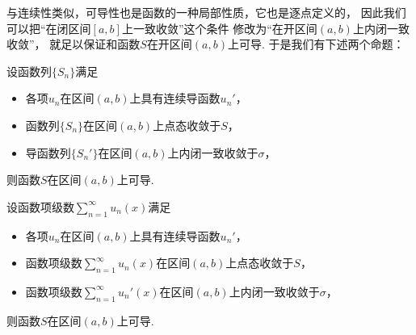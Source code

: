 与连续性类似，可导性也是函数的一种局部性质，它也是逐点定义的，
因此我们可以把“在闭区间\([a,b]\)上一致收敛”这个条件
修改为“在开区间\((a,b)\)上内闭一致收敛”，
就足以保证和函数\(S\)在开区间\((a,b)\)上可导.
于是我们有下述两个命题：
\begin{proposition}
设函数列\(\{S_n\}\)满足\begin{itemize}
	\item 各项\(u_n\)在区间\((a,b)\)上具有连续导函数\(u_n'\)，
	\item 函数列\(\{S_n\}\)在区间\((a,b)\)上点态收敛于\(S\)，
	\item 导函数列\(\{S_n'\}\)在区间\((a,b)\)上内闭一致收敛于\(\sigma\)，
\end{itemize}
则函数\(S\)在区间\((a,b)\)上可导.
\end{proposition}
\begin{proposition}
设函数项级数\(\sum_{n=1}^\infty u_n(x)\)满足\begin{itemize}
	\item 各项\(u_n\)在区间\((a,b)\)上具有连续导函数\(u_n'\)，
	\item 函数项级数\(\sum_{n=1}^\infty u_n(x)\)在区间\((a,b)\)上点态收敛于\(S\)，
	\item 函数项级数\(\sum_{n=1}^\infty u_n'(x)\)在区间\((a,b)\)上内闭一致收敛于\(\sigma\)，
\end{itemize}
则函数\(S\)在区间\((a,b)\)上可导.
\end{proposition}
